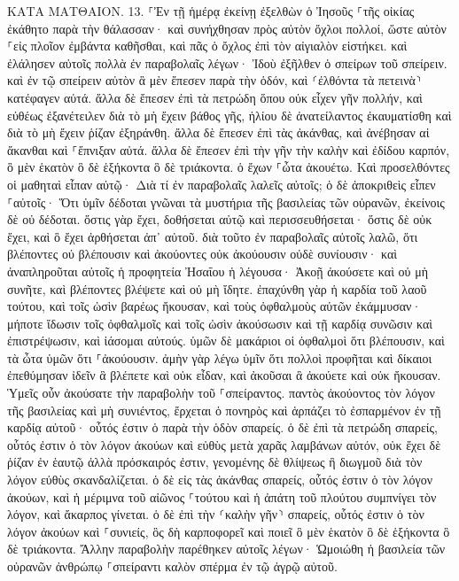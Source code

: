 \documentclass[twoside, 9pt]{extreport}
\begin{document}
ΚΑΤΑ ΜΑΤΘΑΙΟΝ.
13.
⸀Ἐν τῇ ἡμέρᾳ ἐκείνῃ ἐξελθὼν ὁ Ἰησοῦς ⸀τῆς οἰκίας ἐκάθητο παρὰ τὴν θάλασσαν· 
καὶ συνήχθησαν πρὸς αὐτὸν ὄχλοι πολλοί, ὥστε αὐτὸν ⸀εἰς πλοῖον ἐμβάντα καθῆσθαι, καὶ πᾶς ὁ ὄχλος ἐπὶ τὸν αἰγιαλὸν εἱστήκει. 
καὶ ἐλάλησεν αὐτοῖς πολλὰ ἐν παραβολαῖς λέγων· Ἰδοὺ ἐξῆλθεν ὁ σπείρων τοῦ σπείρειν. 
καὶ ἐν τῷ σπείρειν αὐτὸν ἃ μὲν ἔπεσεν παρὰ τὴν ὁδόν, καὶ ⸂ἐλθόντα τὰ πετεινὰ⸃ κατέφαγεν αὐτά. 
ἄλλα δὲ ἔπεσεν ἐπὶ τὰ πετρώδη ὅπου οὐκ εἶχεν γῆν πολλήν, καὶ εὐθέως ἐξανέτειλεν διὰ τὸ μὴ ἔχειν βάθος γῆς, 
ἡλίου δὲ ἀνατείλαντος ἐκαυματίσθη καὶ διὰ τὸ μὴ ἔχειν ῥίζαν ἐξηράνθη. 
ἄλλα δὲ ἔπεσεν ἐπὶ τὰς ἀκάνθας, καὶ ἀνέβησαν αἱ ἄκανθαι καὶ ⸀ἔπνιξαν αὐτά. 
ἄλλα δὲ ἔπεσεν ἐπὶ τὴν γῆν τὴν καλὴν καὶ ἐδίδου καρπόν, ὃ μὲν ἑκατὸν ὃ δὲ ἑξήκοντα ὃ δὲ τριάκοντα. 
ὁ ἔχων ⸀ὦτα ἀκουέτω. 
Καὶ προσελθόντες οἱ μαθηταὶ εἶπαν αὐτῷ· Διὰ τί ἐν παραβολαῖς λαλεῖς αὐτοῖς; 
ὁ δὲ ἀποκριθεὶς εἶπεν ⸀αὐτοῖς· Ὅτι ὑμῖν δέδοται γνῶναι τὰ μυστήρια τῆς βασιλείας τῶν οὐρανῶν, ἐκείνοις δὲ οὐ δέδοται. 
ὅστις γὰρ ἔχει, δοθήσεται αὐτῷ καὶ περισσευθήσεται· ὅστις δὲ οὐκ ἔχει, καὶ ὃ ἔχει ἀρθήσεται ἀπ᾽ αὐτοῦ. 
διὰ τοῦτο ἐν παραβολαῖς αὐτοῖς λαλῶ, ὅτι βλέποντες οὐ βλέπουσιν καὶ ἀκούοντες οὐκ ἀκούουσιν οὐδὲ συνίουσιν· 
καὶ ἀναπληροῦται αὐτοῖς ἡ προφητεία Ἠσαΐου ἡ λέγουσα· Ἀκοῇ ἀκούσετε καὶ οὐ μὴ συνῆτε, καὶ βλέποντες βλέψετε καὶ οὐ μὴ ἴδητε. 
ἐπαχύνθη γὰρ ἡ καρδία τοῦ λαοῦ τούτου, καὶ τοῖς ὠσὶν βαρέως ἤκουσαν, καὶ τοὺς ὀφθαλμοὺς αὐτῶν ἐκάμμυσαν· μήποτε ἴδωσιν τοῖς ὀφθαλμοῖς καὶ τοῖς ὠσὶν ἀκούσωσιν καὶ τῇ καρδίᾳ συνῶσιν καὶ ἐπιστρέψωσιν, καὶ ἰάσομαι αὐτούς. 
ὑμῶν δὲ μακάριοι οἱ ὀφθαλμοὶ ὅτι βλέπουσιν, καὶ τὰ ὦτα ὑμῶν ὅτι ⸀ἀκούουσιν. 
ἀμὴν γὰρ λέγω ὑμῖν ὅτι πολλοὶ προφῆται καὶ δίκαιοι ἐπεθύμησαν ἰδεῖν ἃ βλέπετε καὶ οὐκ εἶδαν, καὶ ἀκοῦσαι ἃ ἀκούετε καὶ οὐκ ἤκουσαν. 
Ὑμεῖς οὖν ἀκούσατε τὴν παραβολὴν τοῦ ⸀σπείραντος. 
παντὸς ἀκούοντος τὸν λόγον τῆς βασιλείας καὶ μὴ συνιέντος, ἔρχεται ὁ πονηρὸς καὶ ἁρπάζει τὸ ἐσπαρμένον ἐν τῇ καρδίᾳ αὐτοῦ· οὗτός ἐστιν ὁ παρὰ τὴν ὁδὸν σπαρείς. 
ὁ δὲ ἐπὶ τὰ πετρώδη σπαρείς, οὗτός ἐστιν ὁ τὸν λόγον ἀκούων καὶ εὐθὺς μετὰ χαρᾶς λαμβάνων αὐτόν, 
οὐκ ἔχει δὲ ῥίζαν ἐν ἑαυτῷ ἀλλὰ πρόσκαιρός ἐστιν, γενομένης δὲ θλίψεως ἢ διωγμοῦ διὰ τὸν λόγον εὐθὺς σκανδαλίζεται. 
ὁ δὲ εἰς τὰς ἀκάνθας σπαρείς, οὗτός ἐστιν ὁ τὸν λόγον ἀκούων, καὶ ἡ μέριμνα τοῦ αἰῶνος ⸀τούτου καὶ ἡ ἀπάτη τοῦ πλούτου συμπνίγει τὸν λόγον, καὶ ἄκαρπος γίνεται. 
ὁ δὲ ἐπὶ τὴν ⸂καλὴν γῆν⸃ σπαρείς, οὗτός ἐστιν ὁ τὸν λόγον ἀκούων καὶ ⸀συνιείς, ὃς δὴ καρποφορεῖ καὶ ποιεῖ ὃ μὲν ἑκατὸν ὃ δὲ ἑξήκοντα ὃ δὲ τριάκοντα. 
Ἄλλην παραβολὴν παρέθηκεν αὐτοῖς λέγων· Ὡμοιώθη ἡ βασιλεία τῶν οὐρανῶν ἀνθρώπῳ ⸀σπείραντι καλὸν σπέρμα ἐν τῷ ἀγρῷ αὐτοῦ. 
\end{document}
